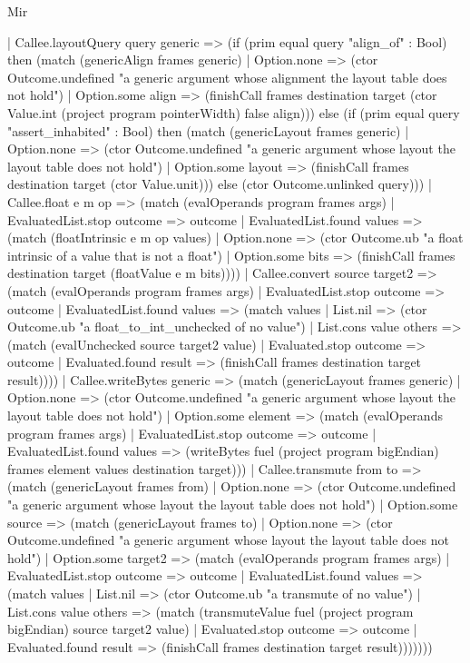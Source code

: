 \begin{lexlean}{Mir}
\begin{semanticmodule}
{    | Callee.layoutQuery query generic => (if (prim equal query "align_of" : Bool) then (match (genericAlign frames generic)
      | Option.none => (ctor Outcome.undefined "a generic argument whose alignment the layout table does not hold")
      | Option.some align => (finishCall frames destination target (ctor Value.int (project program pointerWidth) false align))) else (if (prim equal query "assert_inhabited" : Bool) then (match (genericLayout frames generic)
      | Option.none => (ctor Outcome.undefined "a generic argument whose layout the layout table does not hold")
      | Option.some layout => (finishCall frames destination target (ctor Value.unit))) else (ctor Outcome.unlinked query)))
    | Callee.float e m op => (match (evalOperands program frames args)
      | EvaluatedList.stop outcome => outcome
      | EvaluatedList.found values => (match (floatIntrinsic e m op values)
        | Option.none => (ctor Outcome.ub "a float intrinsic of a value that is not a float")
        | Option.some bits => (finishCall frames destination target (floatValue e m bits))))
    | Callee.convert source target2 => (match (evalOperands program frames args)
      | EvaluatedList.stop outcome => outcome
      | EvaluatedList.found values => (match values
        | List.nil => (ctor Outcome.ub "a float_to_int_unchecked of no value")
        | List.cons value others => (match (evalUnchecked source target2 value)
          | Evaluated.stop outcome => outcome
          | Evaluated.found result => (finishCall frames destination target result))))
    | Callee.writeBytes generic => (match (genericLayout frames generic)
      | Option.none => (ctor Outcome.undefined "a generic argument whose layout the layout table does not hold")
      | Option.some element => (match (evalOperands program frames args)
        | EvaluatedList.stop outcome => outcome
        | EvaluatedList.found values => (writeBytes fuel (project program bigEndian) frames element values destination target)))
    | Callee.transmute from to => (match (genericLayout frames from)
      | Option.none => (ctor Outcome.undefined "a generic argument whose layout the layout table does not hold")
      | Option.some source => (match (genericLayout frames to)
      | Option.none => (ctor Outcome.undefined "a generic argument whose layout the layout table does not hold")
      | Option.some target2 => (match (evalOperands program frames args)
      | EvaluatedList.stop outcome => outcome
      | EvaluatedList.found values => (match values
        | List.nil => (ctor Outcome.ub "a transmute of no value")
        | List.cons value others => (match (transmuteValue fuel (project program bigEndian) source target2 value)
          | Evaluated.stop outcome => outcome
          | Evaluated.found result => (finishCall frames destination target result)))))))
}


\end{semanticmodule}
\end{lexlean}

